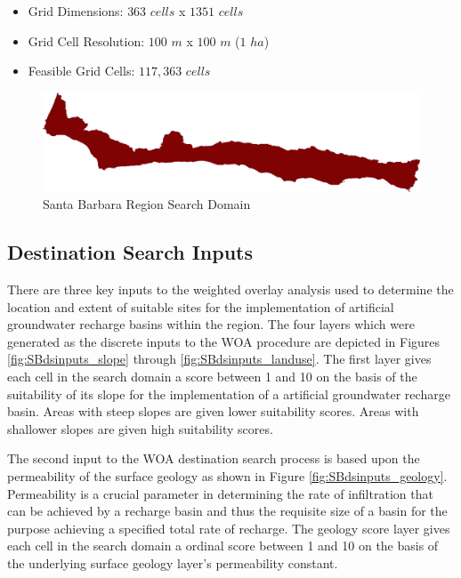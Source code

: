     \begin{itemize}
      \setlength{\itemsep}{0cm}
      \setlength{\parskip}{0cm}
        \item Grid Dimensions: $363$ $cells$ x $1351$ $cells$
        \item Grid Cell Resolution: $100$ $m$ x $100$ $m$ ($1$ $ha$)
        \item Feasible Grid Cells: $117,363$ $cells$
    \end{itemize}
    
        \begin{figure}[!h]
            \begin{center}
            \includegraphics[width=5.5in]{figures/SantaBarbara_SearchDomain.png}   
            \caption{Santa Barbara Region Search Domain}
            \label{fig:SBdomain}
            \end{center}
        \end{figure}
        
    \subsection{Destination Search Inputs}

There are three key inputs to the weighted overlay analysis used to determine the location and extent of suitable sites for the implementation of artificial groundwater recharge basins within the region. The four layers which were generated as the discrete inputs to the WOA procedure are depicted in Figures \ref{fig:SBdsinputs_slope} through \ref{fig:SBdsinputs_landuse}. The first layer gives each cell in the search domain a score between 1 and 10 on the basis of the suitability of its slope for the implementation of a artificial groundwater recharge basin. Areas with steep slopes are given lower suitability scores. Areas with shallower slopes are given high suitability scores. 

The second input to the WOA destination search process is based upon the permeability of the surface geology as shown in Figure \ref{fig:SBdsinputs_geology}. Permeability is a crucial parameter in determining the rate of infiltration that can be achieved by a recharge basin and thus the requisite size of a basin for the purpose achieving a specified total rate of recharge. The geology score layer gives each cell in the search domain a ordinal score between 1 and 10 on the basis of the underlying surface geology layer's permeability constant.

